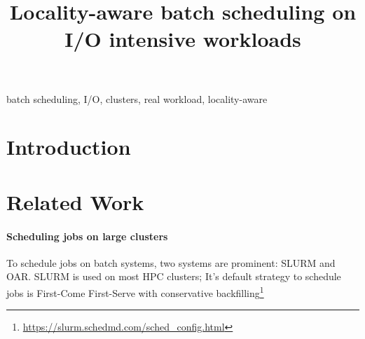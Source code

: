 \documentclass[conference,10pt]{IEEEtran}
\begin{document}
\title{Locality-aware batch scheduling on I/O intensive workloads}

\maketitle

\begin{abstract}

\end{abstract}

\begin{IEEEkeywords}
batch scheduling, I/O, clusters, real workload, locality-aware
\end{IEEEkeywords}


\section{Introduction}\label{sec.introduction}

\section{Related Work}\label{sec.related_work}

\paragraph{Scheduling jobs on large clusters}

To schedule jobs on batch systems, two systems are prominent: SLURM and OAR.
SLURM is used on most HPC clusters; It's default strategy to schedule jobs is 
First-Come First-Serve with conservative backfilling\footnote{{\scriptsize\url{https://slurm.schedmd.com/sched_config.html}}}
\end{document}
